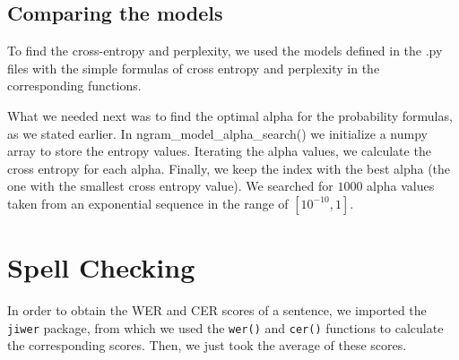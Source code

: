 \documentclass[11pt, a4paper]{article}
\begin{document}
	
	
	
	
	
	
	\subsection{Comparing the models}
	
	To find the cross-entropy and perplexity, we used the models defined in the .py files with the simple formulas of cross entropy and perplexity in the corresponding functions. 
	
	What we needed next was to find the optimal alpha for the probability formulas, as we stated earlier. In ngram\_model\_alpha\_search() we initialize a numpy array to store the entropy values. Iterating the alpha values, we calculate the cross entropy for each alpha. Finally, we keep the index with the best alpha (the one with the smallest cross entropy value). We searched for $1000$ alpha values taken from an exponential sequence in the range of $[10^{-10}, 1]$.
	
	
	\section{Spell Checking}
	
	In order to obtain the WER and CER scores of a sentence, we imported the \texttt{jiwer} package, from which we used the \texttt{wer()} and \texttt{cer()} functions to calculate the corresponding scores. Then, we just took the average of these scores.
	
	
\end{document}

